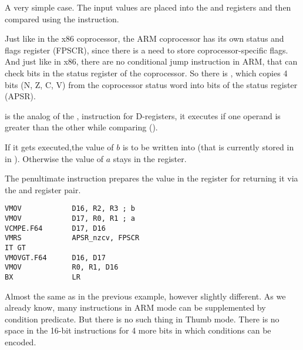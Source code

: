 
\subsubsectionold{\OptimizingXcodeIV (\ARMMode)}



A very simple case.
The input values are placed into the  and  registers and then compared using the  instruction.

Just like in the x86 coprocessor, the ARM coprocessor has its own status and flags register (\ac{FPSCR}),
since there is a need to store coprocessor-specific flags.
And just like in x86, there are no conditional jump instruction in ARM, 
that can check bits in the status register of the coprocessor. 
So there is , which copies 4 bits (N, Z, C, V) from the coprocessor status word into bits of the  status register (\ac{APSR}).

 is the analog of the , 
instruction for D-registers, it executes if one operand is greater than the other while comparing (). 

If it gets executed,the value of $b$ is to be written into  (that is currently stored in in ).
Otherwise the value of $a$ stays in the  register.


The penultimate instruction  prepares the value in the  register for returning it via the  and 
register pair.

\subsubsectionold{\OptimizingXcodeIV (\ThumbTwoMode)}

\begin{lstlisting}[caption=\OptimizingXcodeIV (\ThumbTwoMode)]
VMOV            D16, R2, R3 ; b
VMOV            D17, R0, R1 ; a
VCMPE.F64       D17, D16
VMRS            APSR_nzcv, FPSCR
IT GT 
VMOVGT.F64      D16, D17
VMOV            R0, R1, D16
BX              LR
\end{lstlisting}

Almost the same as in the previous example, however slightly different.
As we already know, many instructions in ARM mode can be supplemented by condition predicate.
But there is no such thing in Thumb mode. 
There is no space in the 16-bit instructions for 4 more bits in which conditions can be encoded.

